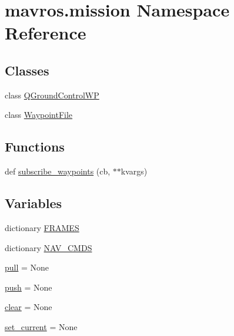 \hypertarget{namespacemavros_1_1mission}{}\section{mavros.\+mission Namespace Reference}
\label{namespacemavros_1_1mission}
\subsection*{Classes}
\begin{DoxyCompactItemize}
\item 
class \mbox{\hyperlink{classmavros_1_1mission_1_1QGroundControlWP}{Q\+Ground\+Control\+WP}}
\item 
class \mbox{\hyperlink{classmavros_1_1mission_1_1WaypointFile}{Waypoint\+File}}
\end{DoxyCompactItemize}
\subsection*{Functions}
\begin{DoxyCompactItemize}
\item 
def \mbox{\hyperlink{namespacemavros_1_1mission_ada55b002a31f5466e6113778ed0a9bf1}{subscribe\+\_\+waypoints}} (cb, $\ast$$\ast$kvargs)
\end{DoxyCompactItemize}
\subsection*{Variables}
\begin{DoxyCompactItemize}
\item 
dictionary \mbox{\hyperlink{namespacemavros_1_1mission_af5ff79b68cc30a1e3fe1f728ad049643}{F\+R\+A\+M\+ES}}
\item 
dictionary \mbox{\hyperlink{namespacemavros_1_1mission_ae942e09010bdb02dbad614e21c30cce4}{N\+A\+V\+\_\+\+C\+M\+DS}}
\item 
\mbox{\hyperlink{namespacemavros_1_1mission_af4eb6d7b6e756f2d9c71623fb0bf4546}{pull}} = None
\item 
\mbox{\hyperlink{namespacemavros_1_1mission_af118ce1d2eed088eebd56ec7aaa2d8c6}{push}} = None
\item 
\mbox{\hyperlink{namespacemavros_1_1mission_afa08761df27335178281b14e9b55a445}{clear}} = None
\item 
\mbox{\hyperlink{namespacemavros_1_1mission_ab368586c0e52ea1ac8ac95147a099cd7}{set\+\_\+current}} = None
\end{DoxyCompactItemize}


